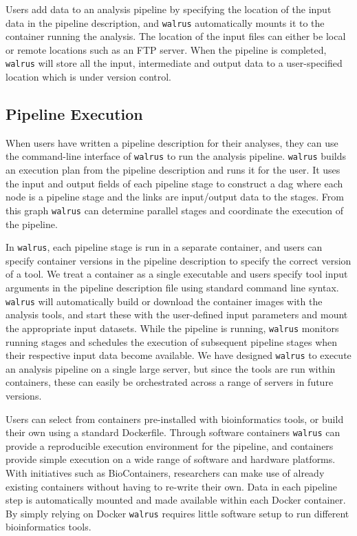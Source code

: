 Users add data to an analysis pipeline by specifying the location of the
input data in the pipeline description, and \texttt{walrus} automatically mounts
it to the container running the analysis. The location of the input files can
either be local or remote locations such as an FTP server. When the pipeline is
completed, \texttt{walrus} will store all the input, intermediate and output
data to a user-specified location which is under version control.

\subsection{Pipeline Execution}
When users have written a pipeline description for their analyses, they can use
the command-line interface of \texttt{walrus} to run the analysis pipeline.
\texttt{walrus} builds an execution plan from the pipeline description and runs
it for the user. It uses the input and output fields of each pipeline stage to
construct a \gls{dag} where each node is a pipeline stage and the links are
input/output data to the stages. From this graph \texttt{walrus} can determine
parallel stages and coordinate the execution of the pipeline. 

In \texttt{walrus}, each pipeline stage is run in a separate container, and
users can specify container versions in the pipeline description to specify the
correct version of a tool. We treat a container as a single executable and users
specify tool input arguments in the pipeline description file using standard
command line syntax. \texttt{walrus} will automatically build or download the
container images with the analysis tools, and start these with the user-defined
input parameters and mount the appropriate input datasets. While the pipeline is
running, \texttt{walrus} monitors running stages and schedules the execution of
subsequent pipeline stages when their respective input data become available. We
have designed \texttt{walrus} to execute an analysis pipeline on a single large
server, but since the tools are run within containers, these can easily be
orchestrated across a range of servers in future versions. 

Users can select from containers pre-installed with bioinformatics tools, or build
their own using a standard Dockerfile. Through software containers
\texttt{walrus} can provide a reproducible execution environment for the
pipeline, and containers provide simple execution on a wide range of software
and hardware platforms. With initiatives such as
BioContainers, researchers can make use of already existing
containers without having to re-write their own. Data in each pipeline step is
automatically mounted and made available within each Docker container. By simply
relying on Docker \texttt{walrus} requires little software setup to run
different bioinformatics tools. 

